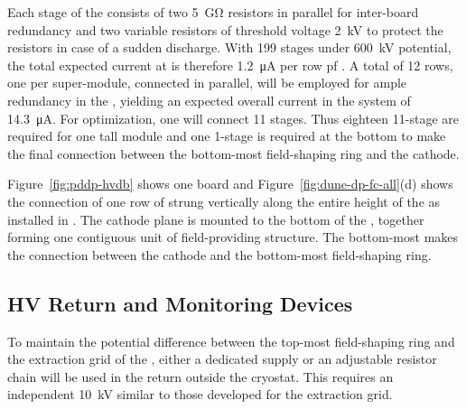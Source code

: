 Each stage of the  consists of two \SI{5}{\giga\ohm} resistors in parallel for inter-board redundancy and two variable resistors of threshold voltage \SI{2}{kV} to protect the resistors in case of a sudden discharge.  With \num{199} stages under \SI{600}{kV} potential, the total expected current at \dptargetdriftvoltpos is therefore \SI{1.2}{\micro\ampere} per row pf .  
A total of \num{12} rows, one per super-module, connected in parallel, will be employed for  ample redundancy in the , yielding an expected overall current in the %
 system of \SI{14.3}{\micro\ampere}.
For optimization, one  will connect \num{11} stages.  %
Thus eighteen \num{11}-stage  are required for one \tpcheight tall module  and one \num{1}-stage  is required at the bottom to make the final connection between the bottom-most field-shaping ring and the cathode.


Figure~\ref{fig:pddp-hvdb} shows one   board and  Figure~\ref{fig:dune-dp-fc-all}(d) shows the connection of one row of  strung vertically along the entire height of the  as installed in . %
The cathode plane is mounted to the bottom of the , together forming one contiguous unit of field-providing structure.  The bottom-most %
 makes the connection between the cathode and the bottom-most field-shaping ring.


\subsection{HV Return and Monitoring Devices}

To maintain the potential difference between the top-most field-shaping ring and the extraction grid of the , either a dedicated  supply or an adjustable resistor chain will be used in the  return outside  the cryostat. %
This requires an independent \SI{10}{kV} \fdth similar to those developed for the extraction grid.

